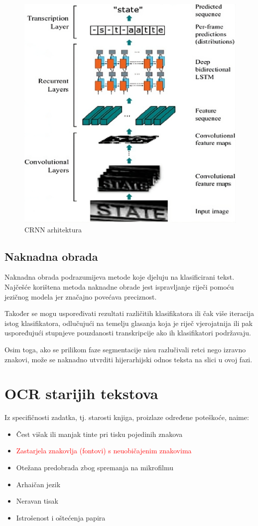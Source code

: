 \documentclass[zavrsnirad]{fer}
\begin{document}
\begin{figure}[hbt]
	\centering
	\includegraphics[width=0.7\linewidth]{Figures/CRNN-architecture.jpeg} 
	\caption{CRNN arhitektura \cite{Dharmale2023}}
	\label{slk:crnn}
\end{figure}


\section{Naknadna obrada}

Naknadna obrada podrazumijeva metode koje djeluju na klasificirani tekst. Najčešće korištena metoda naknadne obrade jest ispravljanje riječi pomoću jezičnog modela jer značajno povećava preciznost.

Također se mogu uspoređivati rezultati različitih klasifikatora ili čak više iteracija istog klasifikatora, odlučujući na temelju glasanja koja je riječ vjerojatnija ili pak uspoređujući stupnjeve pouzdanosti transkripcije ako ih klasifikatori podržavaju.

Osim toga, ako se prilikom faze segmentacije nisu razlučivali retci nego izravno znakovi, može se naknadno utvrditi hijerarhijski odnos teksta na slici u ovoj fazi.

\chapter{OCR starijih tekstova}
\label{pog:ocr_starijih_tekstova}

Iz specifičnosti zadatka, tj. starosti knjiga,  proizlaze određene poteškoće, naime:
\begin{itemize}
	\item Čest višak ili manjak tinte pri tisku pojedinih znakova
	\item \textcolor{red}{Zastarjela znakovlja (fontovi) s neuobičajenim znakovima} %
	\item Otežana predobrada zbog spremanja na mikrofilmu
	\item Arhaičan jezik
	\item Neravan tisak
	\item Istrošenost i oštećenja papira
\end{itemize}
\end{document}
